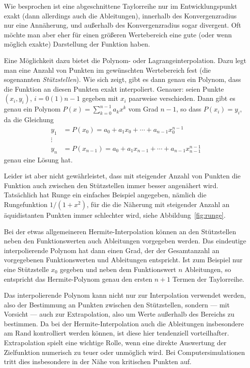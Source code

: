 Wie besprochen ist eine abgeschnittene Taylorreihe nur im
Entwicklungspunkt exakt (dann allerdings auch die Ableitungen),
innerhalb des Konvergenzradius nur eine Annäherung, und außerhalb des
Konvergenzradius sogar divergent.  Oft möchte man aber eher für einen
größeren Wertebereich eine gute (oder wenn möglich exakte) Darstellung
der Funktion haben.

Eine Möglichkeit dazu bietet die Polynom- oder
Lagrangeinterpolation. Dazu legt man eine Anzahl von Punkten im
gewünschten Wertebereich fest (die sogenannten \emph{Stützstellen}).
Wie sich zeigt, gibt es dann genau ein Polynom, dass die Funktion an
diesen Punkten exakt interpoliert. Genauer: seien Punkte $(x_i, y_i)$,
$i=0(1)n-1$ gegeben mit $x_i$ paarweise verschieden. Dann gibt es
genau ein Polynom $P(x)=\sum_{k=0}^{n-1} a_kx^{k}$ vom Grad $n-1$, so
dass $P(x_i) = y_i$, da die Gleichung
\begin{equation}
  \begin{split}
    y_1 &= P(x_0) = a_0 + a_1 x_0 + \cdots + a_{n-1}x_0^{n-1}\\
    \vdots\\
    y_n &= P(x_{n-1}) = a_0 + a_1 x_{n-1} + \cdots + a_{n-1}x_{n-1}^{n-1}
  \end{split}
  \label{eq:interpol}
\end{equation}
genau eine Lösung hat.

Leider ist aber nicht gewährleistet, dass mit steigender Anzahl von
Punkten die Funktion auch zwischen den Stützstellen immer besser
angenähert wird. Tatsächlich hat Runge ein einfaches Beispiel
angegeben, nämlich die Rungefunktion $1/(1+x^2)$, für die die Näherung
mit steigender Anzahl an äquidistanten Punkten immer schlechter wird,
siehe Abbildung~\ref{fig:runge}.

Bei der etwas allgemeineren Hermite-Interpolation können an den
Stützstellen neben den Funktionswerten auch Ableitungen vorgegeben
werden. Das eindeutige interpolierende Polynom hat dann einen Grad,
der der Gesamtanzahl an vorgegebenen Funktionswerten und Ableitungen
entspricht. Ist zum Beispiel nur eine Stützstelle $x_0$ gegeben und
neben dem Funktionswert $n$ Ableitungen, so entspricht das
Hermite-Polynom genau den ersten $n+1$ Termen der Taylorreihe.

Das interpolierende Polynom kann nicht nur zur Interpolation verwendet
werden, also der Bestimmung an Punkten zwischen den Stützstellen,
sondern --- mit Vorsicht --- auch zur Extrapolation, also um Werte
außerhalb des Bereichs zu bestimmen. Da bei der Hermite-Interpolation
auch die Ableitungen insbesondere am Rand kontrolliert werden können,
ist diese hier tendenziell vorteilhafter. Extrapolation spielt eine
wichtige Rolle, wenn eine direkte Auswertung der Zielfunktion
numerisch zu teuer oder unmöglich wird. Bei Computersimulationen tritt
dies insbesondere in der Nähe von kritischen Punkten auf.

